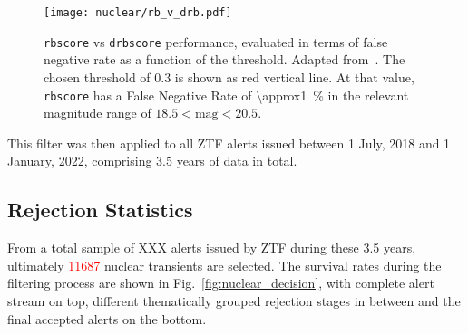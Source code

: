 \begin{figure}[htpb]
    \texttt{[image: nuclear/rb\_v\_drb.pdf]}
    \caption[\texttt{rbscore}/\texttt{drbscore} performance]{\texttt{rbscore} vs \texttt{drbscore} performance, evaluated in terms of false negative rate as a function of the threshold. Adapted from~\cite{Duev2019}. The chosen threshold of 0.3 is shown as red vertical line. At that value, \texttt{rbscore} has a False Negative Rate of \SI{\approx1}{\percent} in the relevant magnitude range of $18.5 < \text{mag} < 20.5$.}
\end{figure}

This filter was then applied to all ZTF alerts issued between 1 July, 2018 and 1 January, 2022, comprising 3.5 years of data in total.

\subsection{Rejection Statistics}
From a total sample of XXX alerts issued by ZTF during these 3.5 years, ultimately \textcolor{red}{11687} nuclear transients are selected. The survival rates during the filtering process are shown in Fig.~\ref{fig:nuclear_decision}, with complete alert stream on top, different thematically grouped rejection stages in between and the final accepted alerts on the bottom.

